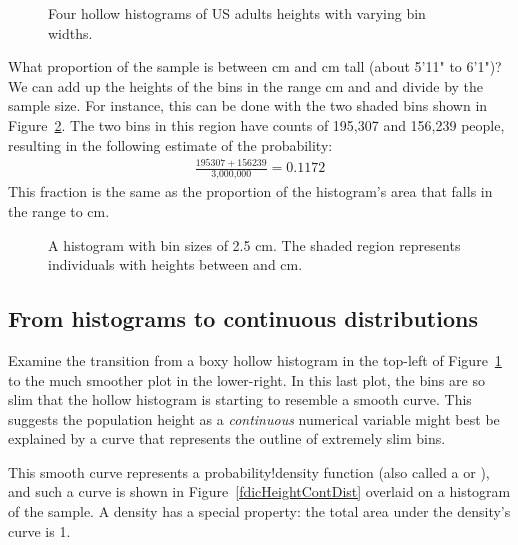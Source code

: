 \begin{figure}[ht]
  \centering
  \caption{Four hollow histograms of US adults heights
      with varying bin widths.}
  \label{fdicHistograms}
\end{figure}

\begin{examplewrap}
\begin{nexample}{What proportion of the sample is between  cm and  cm tall (about 5'11" to 6'1")?}\label{contDistProb}
We can add up the heights of the bins in the range  cm and  and divide by the sample size. For instance, this can be done with the two shaded bins shown in Figure~\ref{usHeightsHist180185}. The two bins in this region have counts of 195,307 and 156,239 people, resulting in the following estimate of the probability:
\begin{align*}
\frac{195307 + 156239}{\text{3,000,000}} = 0.1172
\end{align*}
This fraction is the same as the proportion of the histogram's area that falls in the range  to  cm.
\end{nexample}
\end{examplewrap}

\begin{figure}[h]
  \centering
  \caption{A histogram with bin sizes of 2.5 cm.
      The shaded region represents individuals with
      heights between  and  cm.}
  \label{usHeightsHist180185}
\end{figure}


\D{\newpage}

\subsection{From histograms to continuous distributions}

Examine the transition from a boxy hollow histogram in the top-left of Figure~\ref{fdicHistograms} to the much smoother plot in the lower-right. In this last plot, the bins are so slim that the hollow histogram is starting to resemble a smooth curve. This suggests the population height as a \emph{continuous} numerical variable might best be explained by a curve that represents the outline of extremely slim bins.

This smooth curve represents a
    {probability!density function}
(also called a  or ), and such a curve is shown in Figure~\ref{fdicHeightContDist} overlaid on a histogram of the sample. A density has a special property: the total area under the density's curve is 1. 

